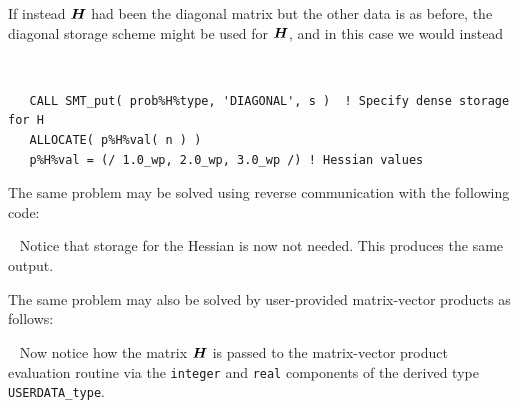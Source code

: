 \documentclass{galahad}
\begin{document}
If instead ${\bm{H}}$ had been the diagonal matrix
but the other data is as before, the diagonal storage scheme 
might be used for ${\bm{H}}$, and in this case we would instead 
{\tt \small
\begin{verbatim}
   CALL SMT_put( prob%H%type, 'DIAGONAL', s )  ! Specify dense storage for H
   ALLOCATE( p%H%val( n ) )
   p%H%val = (/ 1.0_wp, 2.0_wp, 3.0_wp /) ! Hessian values
\end{verbatim}
}
\noindent

The same problem may be solved using reverse communication with the
following code:

{\tt \small
\VerbatimInput{\packageexampleb}
}
\noindent
Notice that storage for the Hessian is now not needed.
This produces the same output.

The same problem may also be solved by user-provided matrix-vector
products as follows:

{\tt \small
\VerbatimInput{\packageexamplec}
}
\noindent
Now notice how the matrix ${\bm{H}}$ is passed to the matrix-vector product 
evaluation routine via the {\tt integer} and 
{\tt real} components of the derived type {\tt USERDATA\_type}.

\end{document}
